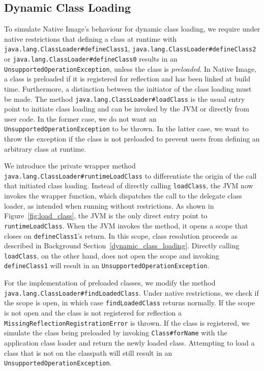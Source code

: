 \subsection{Dynamic Class Loading}
To simulate Native Image's behaviour for dynamic class loading, we require under native restrictions that defining a class at runtime with \verb|java.lang.ClassLoader#defineClass1|, \verb|java.lang.ClassLoader#defineClass2| or \verb|java.lang.ClassLoader#defineClass0| results in an \verb|UnsupportedOperationException|, unless the class is \emph{preloaded}. In Native Image, a class is preloaded if it is registered for reflection and has been linked at build time. 
Furthermore, a distinction between the initiator of the class loading must be made. The method \verb|java.lang.ClassLoader#loadClass| is the usual entry point to initiate class loading and can be invoked by the JVM or directly from user code. In the former case, we do not want an \verb|UnsupportedOperationException| to be thrown. In the latter case, we want to throw the exception if the class is not preloaded to prevent users from defining an arbitrary class at runtime.

We introduce the private wrapper method \verb|java.lang.ClassLoader#runtimeLoadClass| to differentiate the origin of the call that initiated class loading. Instead of directly calling \verb|loadClass|, the JVM now invokes the wrapper function, which dispatches the call to the delegate class loader, as intended when running without restrictions. As shown in Figure~\ref{fig:load_class}, the JVM is the only direct entry point to \verb|runtimeLoadClass|. When the JVM invokes the method, it opens a scope that closes on \verb|defineClass1|'s return. In this scope, class resolution proceeds as described in Background Section~\ref{dynamic_class_loading}. 
Directly calling \verb|loadClass|, on the other hand, does not open the scope and invoking \verb|defineClass1| will result in an \verb|UnsupportedOperationException|.

For the implementation of preloaded classes, we modify the method \verb|java.lang.ClassLoader#findLoadedClass|.
Under native restrictions, we check if the scope is open, in which case \verb|findLoadedClass| returns normally. If the scope is not open and the class is not registered for reflection a \verb|MissingReflectionRegistrationError| is thrown. If the class is registered, we simulate the class being preloaded by invoking \verb|Class#forName| with the application class loader and return the newly loaded class. Attempting to load a class that is not on the classpath will still result in an \verb|UnsupportedOperationException|.

